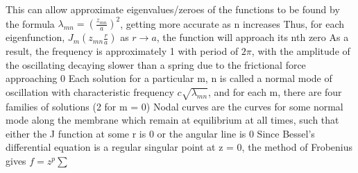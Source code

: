 \documentclass[11 pt, twoside]{article}
\newenvironment{outline*}
{
	\begin{outline}[enumerate]
	}
	{\end{outline}
}
\begin{document}
\begin{outline*}
			\4 This can allow approximate eigenvalues/zeroes of the functions to be found by the formula $\lambda_{mn} = (\frac{z_{mn}}{a})^2$, getting more accurate as n increases
			\4 Thus, for each eigenfunction, $J_m(z_{mn}\frac{r}{a})$ as $r \to a$, the function will approach its nth zero
		\3 As a result, the frequency is approximately 1 with period of $2\pi$, with the amplitude of the oscillating decaying slower than a spring due to the frictional force approaching 0
	\2 Each solution for a particular m, n is called a normal mode of oscillation with characteristic frequency $c\sqrt{\lambda_{mn}}$, and for each m, there are four families of solutions (2 for m = 0)
		\3 Nodal curves are the curves for some normal mode along the membrane which remain at equilibrium at all times, such that either the J function at some r is 0 or the angular line is 0
	\2 Since Bessel's differential equation is a regular singular point at z = 0, the method of Frobenius gives $f = z^p \sum$
\end{outline*}
\end{document}
